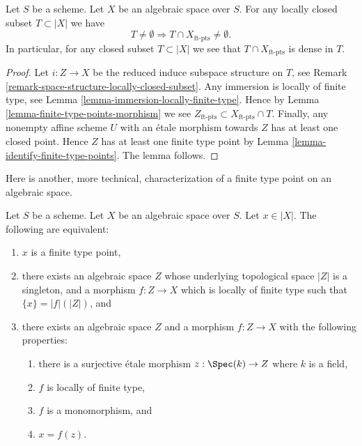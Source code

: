 \begin{lemma}
\label{lemma-enough-finite-type-points}
Let $S$ be a scheme. Let $X$ be an algebraic space over $S$.
For any locally closed subset $T \subset |X|$ we have
$$
T \not = \emptyset
\Rightarrow
T \cap X_{\text{ft-pts}} \not = \emptyset.
$$
In particular, for any closed subset $T \subset |X|$ we
see that $T \cap X_{\text{ft-pts}}$ is dense in $T$.
\end{lemma}

\begin{proof}
Let $i : Z \to X$ be the reduced induce subspace structure on $T$, see
Remark \ref{remark-space-structure-locally-closed-subset}.
Any immersion is locally of finite type, see
Lemma \ref{lemma-immersion-locally-finite-type}.
Hence by
Lemma \ref{lemma-finite-type-points-morphism}
we see $Z_{\text{ft-pts}} \subset X_{\text{ft-pts}} \cap T$.
Finally, any nonempty affine scheme $U$ with an \'etale morphism towards
$Z$ has at least one closed point. Hence $Z$ has at least one
finite type point by
Lemma \ref{lemma-identify-finite-type-points}.
The lemma follows.
\end{proof}

\noindent
Here is another, more technical, characterization of a finite type
point on an algebraic space.

\begin{lemma}
\label{lemma-point-finite-type-monomorphism}
Let $S$ be a scheme. Let $X$ be an algebraic space over $S$.
Let $x \in |X|$. The following are equivalent:
\begin{enumerate}
\item $x$ is a finite type point,
\item there exists an algebraic space $Z$ whose underlying topological space
$|Z|$ is a singleton, and a morphism $f : Z \to X$ which is locally of finite
type such that $\{x\} = |f|(|Z|)$, and
\item there exists an algebraic space $Z$ and a morphism $f : Z \to X$
with the following properties:
\begin{enumerate}
\item there is a surjective \'etale morphism
$z : \Spec(k) \to Z$ where $k$ is a field,
\item $f$ is locally of finite type,
\item $f$ is a monomorphism, and
\item $x = f(z)$.
\end{enumerate}
\end{enumerate}
\end{lemma}

